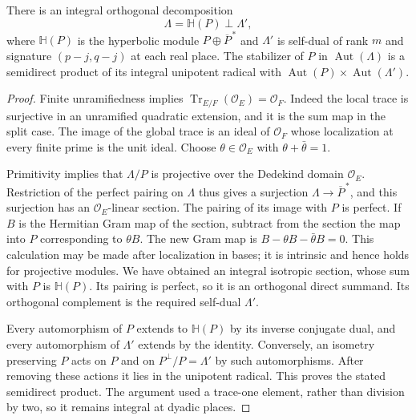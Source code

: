 \begin{lemma}\label{rv-integral-splitting}
There is an integral orthogonal decomposition
\[
                     \Lambda=\mathbb H(P)\perp\Lambda',
\]
where $\mathbb H(P)$ is the hyperbolic module
$P\oplus\overline P^{\,*}$ and $\Lambda'$ is self-dual
of rank $m$ and signature $(p-j,q-j)$ at each real place.
The stabilizer of $P$ in $\operatorname{Aut}(\Lambda)$
is a semidirect product of its integral unipotent radical
with
$\operatorname{Aut}(P)\times\operatorname{Aut}(\Lambda')$.
\end{lemma}
\begin{proof}
Finite unramifiedness implies
$\operatorname{Tr}_{E/F}(\mathcal O_E)=\mathcal O_F$.
Indeed the local trace is surjective in an unramified
quadratic extension, and it is the sum map in the split
case.  The image of the global trace is an ideal of
$\mathcal O_F$ whose localization at every finite prime
is the unit ideal.  Choose $\theta\in\mathcal O_E$ with
$\theta+\bar\theta=1$.

Primitivity implies that $\Lambda/P$ is projective over
the Dedekind domain $\mathcal O_E$.  Restriction of the
perfect pairing on $\Lambda$ thus gives a surjection
$\Lambda\to\overline P^{\,*}$, and this surjection has
an $\mathcal O_E$-linear section.  The pairing of its
image with $P$ is perfect.  If $B$ is the Hermitian
Gram map of the section, subtract from the section
the map into $P$ corresponding to $\theta B$.
The new Gram map is
$B-\theta B-\bar\theta B=0$.
This calculation may be made after localization in
bases; it is intrinsic and hence holds for projective
modules.  We have obtained an integral isotropic
section, whose sum with $P$ is $\mathbb H(P)$.
Its pairing is perfect, so it is an orthogonal direct
summand.  Its orthogonal complement is the required
self-dual $\Lambda'$.

Every automorphism of $P$ extends to $\mathbb H(P)$
by its inverse conjugate dual, and every automorphism
of $\Lambda'$ extends by the identity.  Conversely,
an isometry preserving $P$ acts on $P$ and on
$P^\perp/P=\Lambda'$ by such automorphisms.
After removing these actions it lies in the unipotent
radical.  This proves the stated semidirect product.
The argument used a trace-one element, rather than
division by two, so it remains integral at dyadic places.
\end{proof}

